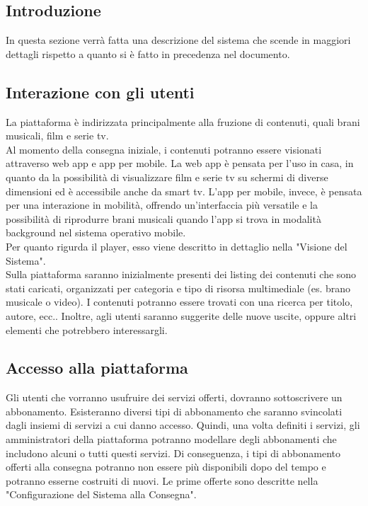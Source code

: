 
\subsection{Introduzione}
In questa sezione verrà fatta una descrizione del sistema che scende in maggiori dettagli rispetto a quanto
si è fatto in precedenza nel documento.

\subsection{Interazione con gli utenti}
La piattaforma è indirizzata principalmente alla fruzione di contenuti, quali brani musicali, film e serie tv.\\
Al momento della consegna iniziale, i contenuti potranno essere visionati attraverso web app e app per mobile.
La web app è pensata per l'uso in casa, in quanto da la possibilità di visualizzare film e serie tv su schermi
di diverse dimensioni ed è accessibile anche da smart tv. L'app per mobile, invece, è pensata per una
interazione in mobilità, offrendo un'interfaccia più versatile e la possibilità di riprodurre brani musicali
quando l'app si trova in modalità background nel sistema operativo mobile.\\
Per quanto rigurda il player, esso viene descritto in dettaglio nella "Visione del Sistema".\\
Sulla piattaforma saranno inizialmente presenti dei listing dei contenuti che sono stati caricati, organizzati per 
categoria e tipo di risorsa multimediale (es. brano musicale o video). I contenuti potranno essere trovati
con una ricerca per titolo, autore, ecc.. Inoltre, agli utenti saranno suggerite delle nuove uscite,
oppure altri elementi che potrebbero interessargli.\\

\subsection{Accesso alla piattaforma}
Gli utenti che vorranno usufruire dei servizi offerti, dovranno sottoscrivere un abbonamento. Esisteranno diversi
tipi di abbonamento che saranno svincolati dagli insiemi di servizi a cui danno accesso. Quindi, una volta definiti
i servizi, gli amministratori della piattaforma potranno modellare degli abbonamenti che includono alcuni o
tutti questi servizi. Di conseguenza, i tipi di abbonamento offerti alla consegna potranno non essere più
disponibili dopo del tempo e potranno esserne costruiti di nuovi.
Le prime offerte sono descritte nella "Configurazione del Sistema alla Consegna".

